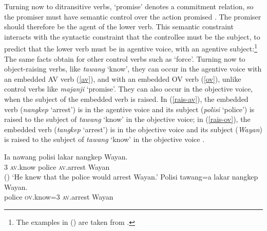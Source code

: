 Turning now to ditransitive verbs,  `promise' denotes a commitment relation, so the promiser must have
semantic control over the action promised \citep{Farkas1988,Kroeger1993,SagandPollard1991}\addpages. The
promiser should therefore be the agent of the lower verb. This semantic constraint interacts
with the syntactic constraint that the controllee must be the subject, to predict that the
lower verb must be in agentive voice, with an agentive subject:\footnote{%
  The examples in () are taken from .
}
\eal
{}
\zl
The same facts obtain for other control verbs such as  `force'.
Turning now to object-raising verbs, like \emph{tawang} `know',  they can occur in the agentive
voice with an embedded AV verb (\ref{av}), and with an embedded OV verb (\ref{ov}), unlike control
verbs like \emph{majanji} `promise'. 
They can also occur in the objective voice, when the subject of the embedded verb is raised.  In
(\ref{rais-av}), the embedded verb (\emph{nangkep} `arrest') is in the agentive voice and its
subject (\emph{polisi} `police') is raised to the subject of \emph{tawang} `know' in the objective
voice; in (\ref{rais-ov}), the embedded verb (\emph{tangkep} `arrest') is in the objective voice and
its subject (\emph{Wayan}) is raised to the subject of \emph{tawang} `know' in the objective voice \citep[ex 23]{WechslerandArka1998}.

\eal
\ex 
\label{av}
\gll Ia nawang          polisi lakar  nangkep            Wayan. \\
     3 \textsc{av}.know police \FUT{} \textsc{av}.arrest Wayan \\\hfill()
\glt `He knew that the police would arrest Wayan.'
\ex
\label{rais-av} 
\gll Polisi tawang=a           lakar  nangkep            Wayan. \\
     police \textsc{ov}.know=3 \FUT{} \textsc{av}.arrest Wayan\\

